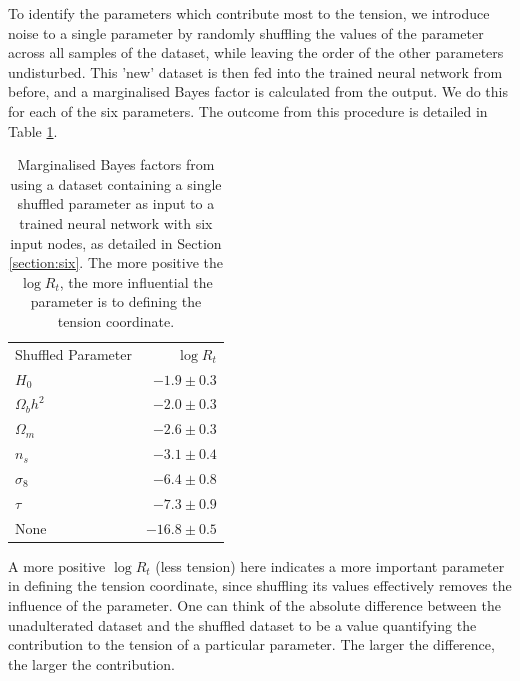 \documentclass[%
 reprint,
 amsmath,amssymb,
 aps,
]{revtex4-2}
\begin{document}
To identify the parameters which contribute most to the tension, we introduce noise to a single parameter by randomly shuffling the values of the parameter across all samples of the dataset, while leaving the order of the other parameters undisturbed. This 'new' dataset is then fed into the trained neural network from before, and a marginalised Bayes factor is calculated from the output. We do this for each of the six parameters. The outcome from this procedure is detailed in Table \ref{table:shuffled}.

\begin{table}
\begin{ruledtabular}
\begin{tabular}{lr}
    Shuffled Parameter & $\log R_t$ \\
    \colrule
    $H_0$           & $-1.9 \pm 0.3$ \\
    $\Omega_b h^2$  & $-2.0 \pm 0.3$ \\
    $\Omega_m$      & $-2.6 \pm 0.3$ \\
    $n_s$           & $-3.1 \pm 0.4$ \\
    $\sigma_8$      & $-6.4 \pm 0.8$ \\
    $\tau$          & $-7.3 \pm 0.9$ \\
    \colrule
    None            & $-16.8 \pm 0.5$ \\
\end{tabular}
\end{ruledtabular}
\caption{Marginalised Bayes factors from using a dataset containing a single shuffled parameter as input to a trained neural network with six input nodes, as detailed in Section \ref{section:six}. The more positive the $\log R_t$, the more influential the parameter is to defining the tension coordinate.}
\label{table:shuffled}
\end{table}

A more positive $\log R_t$ (less tension) here indicates a more important parameter in defining the tension coordinate, since shuffling its values effectively removes the influence of the parameter. One can think of the absolute difference between the unadulterated dataset and the shuffled dataset to be a value quantifying the contribution to the tension of a particular parameter. The larger the difference, the larger the contribution. 
\end{document}
